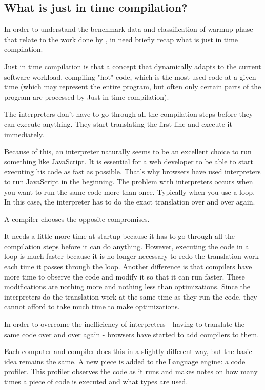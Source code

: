 \documentclass{article}
\begin{document}
\subsection{What is just in time compilation? }


In order to understand the benchmark data and classification of warmup phase that relate to the work done by \citep{barrett2017virtual}, in need briefly recap what is just in time compilation.

Just in time compilation \citep{aycock2003brief} is that a concept that dynamically adapts to the current software workload, compiling "hot" code, which is the most used code at a given time (which may represent the entire program, but often only certain parts of the program are processed by Just in time compilation).

The interpreters don't have to go through all the compilation steps before they can execute anything. They start translating the first line and execute it immediately.

Because of this, an interpreter naturally seems to be an excellent choice to run something like JavaScript. It is essential for a web developer to be able to start executing his code as fast as possible. That's why browsers have used interpreters to run JavaScript in the beginning.
The problem with interpreters occurs when you want to run the same code more than once. Typically when you use a loop. In this case, the interpreter has to do the exact translation over and over again.

A compiler chooses the opposite compromises.

It needs a little more time at startup because it has to go through all the compilation steps before it can do anything. However, executing the code in a loop is much faster because it is no longer necessary to redo the translation work each time it passes through the loop.
Another difference is that compilers have more time to observe the code and modify it so that it can run faster. These modifications are nothing more and nothing less than optimizations. Since the interpreters do the translation work at the same time as they run the code, they cannot afford to take much time to make optimizations.

In order to overcome the inefficiency of interpreters - having to translate the same code over and over again - browsers have started to add compilers to them.

Each computer and compiler does this in a slightly different way, but the basic idea remains the same. A new piece is added to the Language engine: a code profiler. This profiler observes the code as it runs and makes notes on how many times a piece of code is executed and what types are used.
\end{document}
